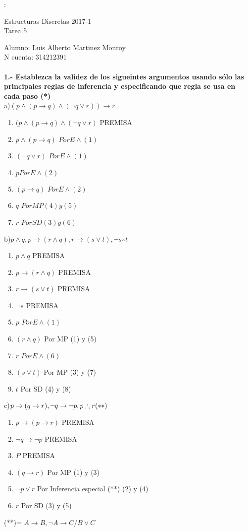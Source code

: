 \documentclass[paper=letter, fontsize=12pt]{scrartcl}
\begin{document}
\parindent=0mm:
	\begin{center}
  Estructuras Discretas 2017-1\\
  Tarea 5\\
\end{center}

Alumno: Luis Alberto Martinez Monroy\\
N cuenta: 314212391\\ \\

{\bf 1.- Establezca la validez de los sigueintes argumentos usando sólo las principales reglas de inferencia y especificando que regla se usa en cada paso (*)}\\

a)$(p\wedge (p\rightarrow q)\wedge (\neg q \vee r))\rightarrow r$
\begin{enumerate}
	\item$(p\wedge (p\rightarrow q)\wedge (\neg q \vee r)$ PREMISA
	\item$p \wedge (p\rightarrow q)$ $Por E\wedge  (1)$
	\item$(\neg q \vee r)$ $Por E\wedge  (1)$
	\item$p $$Por E\wedge  (2)$
	\item$(p\rightarrow q)$ $Por E\wedge  (2)$
	\item$q$ $Por MP (4)y(5)$
	\item$r$ $Por SD (3)y(6)$
\end{enumerate}

b)$p\wedge q, p\rightarrow (r\wedge q), r\rightarrow (s\vee t), \neg s \therefore t $\\
\begin{enumerate}
	\item$p\wedge q$ PREMISA
	\item$p\rightarrow (r\wedge q)$ PREMISA
	\item$r\rightarrow (s\vee t)$ PREMISA
	\item$\neg s$ PREMISA
	\item$p $ $Por E\wedge (1)$
	\item$(r\wedge q)$ Por MP (1) y (5)
	\item$r$ $Por E\wedge (6)$
	\item$(s\vee t)$ Por MP (3) y (7)
	\item$t$ Por SD (4) y (8)
\end{enumerate}

c)$p\rightarrow (q\rightarrow r), \neg q \rightarrow \neg p, p \therefore r {\bf(**)}$
\begin{enumerate}
	\item$p\rightarrow (p\rightarrow r)$ PREMISA
	\item$\neg q \rightarrow \neg p$ PREMISA
	\item$P$ PREMISA
	\item$(q\rightarrow r)$ Por MP (1) y (3)
	\item$\neg p \vee r$ Por Inferencia especial (**) (2) y (4)
	\item$r$ Por SD (3) y (5)	
\end{enumerate}
(**)= $A\rightarrow B, \neg A \rightarrow C / B\vee C$\\
\end{document}
